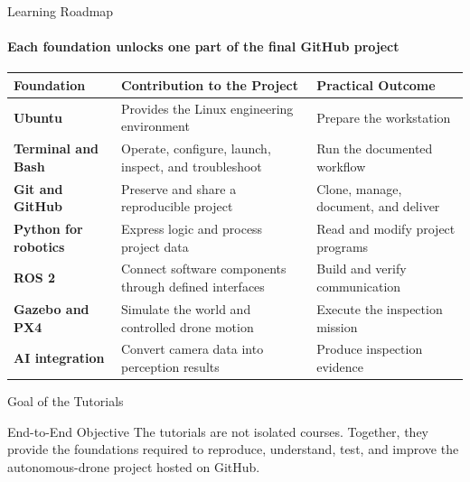 \begin{frame}{Learning Roadmap}
    \framesubtitle{Each foundation unlocks one part of the final GitHub project}
    \footnotesize
    \renewcommand{\arraystretch}{1.16}
    \begin{tabularx}{\textwidth}{>{\bfseries\color{um6p-color-dark-blue}}p{} X >{\centering\arraybackslash}p{}}
        \toprule
        Foundation & Contribution to the Project & Practical Outcome \\
        \midrule
        Ubuntu & Provides the Linux engineering environment & Prepare the workstation \\
        Terminal and Bash & Operate, configure, launch, inspect, and troubleshoot & Run the documented workflow \\
        Git and GitHub & Preserve and share a reproducible project & Clone, manage, document, and deliver \\
        Python for robotics & Express logic and process project data & Read and modify project programs \\
        ROS 2 & Connect software components through defined interfaces & Build and verify communication \\
        Gazebo and PX4 & Simulate the world and controlled drone motion & Execute the inspection mission \\
        AI integration & Convert camera data into perception results & Produce inspection evidence \\
        \bottomrule
    \end{tabularx}
\end{frame}


\begin{frame}{Goal of the Tutorials}
    
    \begin{alertblock}{End-to-End Objective}
        The tutorials are not isolated courses. Together, they provide the foundations required to reproduce, understand, test, and improve the autonomous-drone project hosted on GitHub.
    \end{alertblock}

\end{frame}




